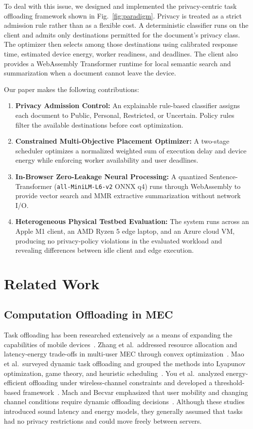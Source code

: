 \documentclass[conference]{IEEEtran}
\begin{document}
To deal with this issue, we designed and implemented the privacy-centric task offloading framework shown in Fig.~\ref{fig:paradigm}.
Privacy is treated as a strict admission rule rather than as a flexible cost.
A deterministic classifier runs on the client and admits only destinations permitted for the document's privacy class.
The optimizer then selects among those destinations using calibrated response time, estimated device energy, worker readiness, and deadlines.
The client also provides a WebAssembly Transformer runtime for local semantic search and summarization when a document cannot leave the device.

Our paper makes the following contributions:
\begin{enumerate}
  \item \textbf{Privacy Admission Control:} An explainable rule-based classifier assigns each document to Public, Personal, Restricted, or Uncertain. Policy rules filter the available destinations before cost optimization.
  \item \textbf{Constrained Multi-Objective Placement Optimizer:} A two-stage scheduler optimizes a normalized weighted sum of execution delay and device energy while enforcing worker availability and user deadlines.
  \item \textbf{In-Browser Zero-Leakage Neural Processing:} A quantized Sentence-Transformer (\texttt{all-MiniLM-L6-v2} ONNX q4) runs through WebAssembly to provide vector search and MMR extractive summarization without network I/O.
  \item \textbf{Heterogeneous Physical Testbed Evaluation:} The system runs across an Apple M1 client, an AMD Ryzen 5 edge laptop, and an Azure cloud VM, producing no privacy-policy violations in the evaluated workload and revealing differences between idle client and edge execution.
\end{enumerate}

\section{Related Work}

\subsection{Computation Offloading in MEC}
Task offloading has been researched extensively as a means of expanding the capabilities of mobile devices~\cite{etsi_mec,shi2016}.
Zhang et al.\ addressed resource allocation and latency-energy trade-offs in multi-user MEC through convex optimization~\cite{zhang2018}.
Mao et al.\ surveyed dynamic task offloading and grouped the methods into Lyapunov optimization, game theory, and heuristic scheduling~\cite{mao2017}.
You et al.\ analyzed energy-efficient offloading under wireless-channel constraints and developed a threshold-based framework~\cite{you2017}.
Mach and Becvar emphasized that user mobility and changing channel conditions require dynamic offloading decisions~\cite{mach2017}.
Although these studies introduced sound latency and energy models, they generally assumed that tasks had no privacy restrictions and could move freely between servers.
\end{document}
